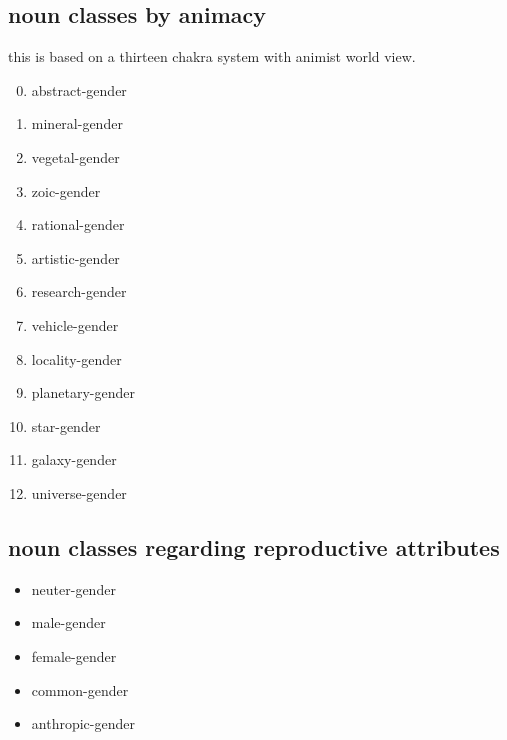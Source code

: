\begin{multicols}{2}
\subsection{noun classes by animacy}
\label{animacy}
this is based on a thirteen chakra system with animist world
view.
\begin{enumerate}
\setcounter{enumi}{-1}
\item abstract-gender
\item mineral-gender
\item vegetal-gender
\item zoic-gender
\item rational-gender
\item artistic-gender
\item research-gender
\item vehicle-gender
\item locality-gender
\item planetary-gender
\item star-gender
\item galaxy-gender
\item universe-gender
\end{enumerate}
\subsection{noun classes regarding reproductive attributes}
\label{gender}
\begin{itemize}
\item neuter-gender
\item male-gender
\item female-gender
\item common-gender
\item anthropic-gender
\end{itemize}
\end{multicols}

